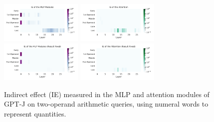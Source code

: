 \documentclass[11pt]{article}
\begin{document}
\begin{figure}[t]
    \centering
    \includegraphics[width=0.35\textwidth]{img/j/j-mlp-words.pdf}
    \includegraphics[width=0.35\textwidth]{img/j/j-attn-words.pdf}
    \includegraphics[width=0.35\textwidth]{img/j/j-mlp-words-int2.pdf}
    \includegraphics[width=0.35\textwidth]{img/j/j-attn-words-int2.pdf}
    \caption{Indirect effect (IE) measured in the MLP and attention modules of GPT-J on two-operand arithmetic queries, using numeral words to represent quantities.}
    \label{fig:j-heatmap-words}
\end{figure}
\end{document}
